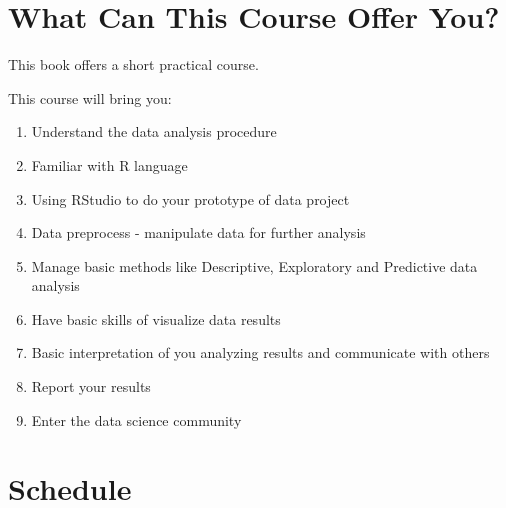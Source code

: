 \documentclass[
]{book}
\providecommand{\tightlist}{%
  \setlength{\itemsep}{0pt}\setlength{\parskip}{0pt}}
\begin{document}
\hypertarget{what-can-this-course-offer-you}{%
\section{What Can This Course Offer You?}\label{what-can-this-course-offer-you}}

This book offers a short practical course.

This course will bring you:

\begin{enumerate}
\def\labelenumi{\arabic{enumi}.}
\tightlist
\item
  Understand the data analysis procedure
\item
  Familiar with R language
\item
  Using RStudio to do your prototype of data project
\item
  Data preprocess - manipulate data for further analysis
\item
  Manage basic methods like Descriptive, Exploratory and Predictive data analysis
\item
  Have basic skills of visualize data results
\item
  Basic interpretation of you analyzing results and communicate with others
\item
  Report your results
\item
  Enter the data science community
\end{enumerate}

\hypertarget{schedule}{%
\section{Schedule}\label{schedule}}
\end{document}
